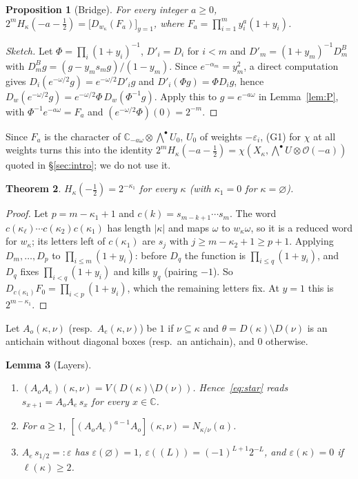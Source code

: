 \documentclass[submission]{FPSAC2027}
\newtheorem{theorem}{Theorem}[section]
\newtheorem{proposition}[theorem]{Proposition}
\newtheorem{lemma}[theorem]{Lemma}
\theoremstyle{definition}
\theoremstyle{remark}
\newcommand{\cO}{\mathcal{O}}
\newcommand{\C}{\mathbb{C}}
\begin{document}
\begin{proposition}[Bridge]\label{prop:bridge}
For every integer $a\ge0$, $2^mH_\kappa(-a-\tfrac12)=\bigl[D_{w_\kappa}(F_a)\bigr]_{y=1}$, where
$F_a=\prod_{i=1}^my_i^a(1+y_i)$.
\end{proposition}

\begin{proof}[Sketch]
Let $\Phi=\prod_i(1+y_i)^{-1}$, $D'_i=D_i$ for $i<m$ and $D'_m=(1+y_m)^{-1}D^B_m$ with
$D^B_mg=(g-y_ms_mg)/(1-y_m)$. Since $e^{-\alpha_m}=y_m^2$, a direct computation gives
$D_i(e^{-\omega/2}g)=e^{-\omega/2}D'_ig$ and $D'_i(\Phi g)=\Phi D_ig$, hence
$D_w(e^{-\omega/2}g)=e^{-\omega/2}\Phi\,D_w(\Phi^{-1}g)$. Apply this to $g=e^{-a\omega}$ in
Lemma~\ref{lem:P}, with $\Phi^{-1}e^{-a\omega}=F_a$ and $(e^{-\omega/2}\Phi)(0)=2^{-m}$.
\end{proof}

Since $F_a$ is the character of $\C_{-a\omega}\otimes\bigwedge^\bullet U_0$, $U_0$ of weights
$-\varepsilon_i$, (G1) for $\chi$ at all weights turns this into the identity
$2^mH_\kappa(-a-\tfrac12)=\chi(X_\kappa,\bigwedge^\bullet U\otimes\cO(-a))$ quoted in
\S\ref{sec:intro}; we do not use it.

\begin{theorem}\label{thm:A}
$H_\kappa(-\tfrac12)=2^{-\kappa_1}$ for every $\kappa$ (with $\kappa_1=0$ for $\kappa=\varnothing$).
\end{theorem}

\begin{proof}
Let $p=m-\kappa_1+1$ and $c(k)=s_{m-k+1}\cdots s_m$. The word
$c(\kappa_\ell)\cdots c(\kappa_2)c(\kappa_1)$ has length $|\kappa|$ and maps $\omega$ to $w_\kappa\omega$,
so it is a reduced word for $w_\kappa$; its letters left of $c(\kappa_1)$ are $s_j$ with
$j\ge m-\kappa_2+1\ge p+1$. Applying
$D_m,\dots,D_p$ to $\prod_{i\le m}(1+y_i)$: before $D_q$ the function is
$\prod_{i\le q}(1+y_i)$, and $D_q$ fixes $\prod_{i<q}(1+y_i)$ and kills $y_q$ (pairing $-1$). So
$D_{c(\kappa_1)}F_0=\prod_{i<p}(1+y_i)$, which the remaining letters fix. At $y=1$ this is $2^{m-\kappa_1}$.
\end{proof}

Let $A_o(\kappa,\nu)$ (resp.\ $A_e(\kappa,\nu)$) be $1$ if $\nu\subseteq\kappa$ and
$\theta=D(\kappa)\setminus D(\nu)$ is an antichain without diagonal boxes (resp.\ an antichain),
and $0$ otherwise.

\begin{lemma}[Layers]\label{lem:layers}
\begin{enumerate}[label=(\alph*)]
\item $(A_oA_e)(\kappa,\nu)=V(D(\kappa)\setminus D(\nu))$. Hence~\eqref{eq:star} reads
$s_{x+1}=A_oA_e\,s_x$ for every $x\in\C$.
\item For $a\ge1$, $[(A_oA_e)^{a-1}A_o](\kappa,\nu)=N_{\kappa/\nu}(a)$.
\item $A_e\,s_{1/2}=:\varepsilon$ has $\varepsilon(\varnothing)=1$, $\varepsilon((L))=(-1)^{L+1}2^{-L}$,
and $\varepsilon(\kappa)=0$ if $\ell(\kappa)\ge2$.
\end{enumerate}
\end{lemma}
\end{document}
